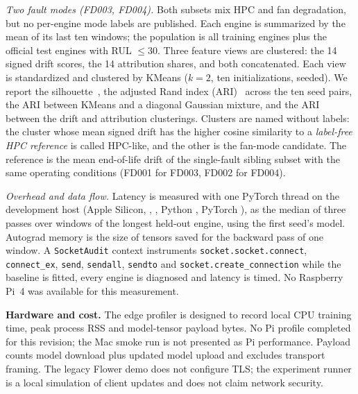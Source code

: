 \emph{Two fault modes (FD003, FD004).} Both subsets mix HPC and fan degradation, but no per-engine mode labels are published. Each engine is summarized by the mean of its last ten windows; the population is all training engines plus the official test engines with RUL $\le30$. Three feature views are clustered: the 14 signed drift scores, the 14 attribution shares, and both concatenated. Each view is standardized and clustered by KMeans ($k{=}2$, ten initializations, seeded). We report the silhouette~\cite{rousseeuw1987silhouettes}, the adjusted Rand index (ARI)~\cite{hubert1985comparing} across the ten seed pairs, the ARI between KMeans and a diagonal Gaussian mixture, and the ARI between the drift and attribution clusterings. Clusters are named without labels: the cluster whose mean signed drift has the higher cosine similarity to a \emph{label-free HPC reference} is called HPC-like, and the other is the fan-mode candidate. The reference is the mean end-of-life drift of the single-fault sibling subset with the same operating conditions (FD001 for FD003, FD002 for FD004).

\emph{Overhead and data flow.} Latency is measured with one PyTorch thread on the development host (Apple Silicon, \texttt{\DiagMachine{}}, \DiagSystem{}, Python \DiagPython{}, PyTorch \DiagTorch{}), as the median of three passes over \DiagWindowsTimed{} windows of the longest held-out engine, using the first seed's model. Autograd memory is the size of tensors saved for the backward pass of one window. A \texttt{SocketAudit} context instruments \texttt{socket.socket.connect}, \texttt{connect\_ex}, \texttt{send}, \texttt{sendall}, \texttt{sendto} and \texttt{socket.create\_connection} while the baseline is fitted, every engine is diagnosed and latency is timed. No Raspberry Pi~4 was available for this measurement.

\textbf{Hardware and cost.} The edge profiler is designed to record local CPU training time, peak process RSS and model-tensor payload bytes. No Pi profile completed for this revision; the Mac smoke run is not presented as Pi performance. Payload counts model download plus updated model upload and excludes transport framing. The legacy Flower demo does not configure TLS; the experiment runner is a local simulation of client updates and does not claim network security.
